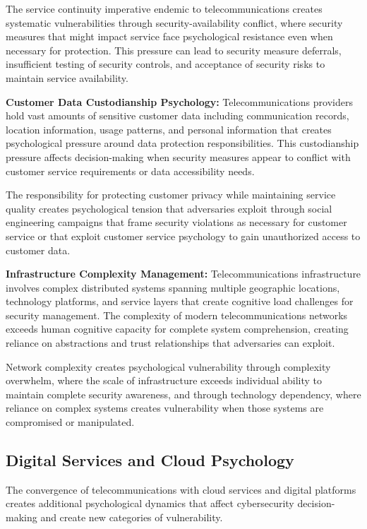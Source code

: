 \documentclass[10pt, twocolumn]{article}
\begin{document}
The service continuity imperative endemic to telecommunications creates systematic vulnerabilities through security-availability conflict, where security measures that might impact service face psychological resistance even when necessary for protection. This pressure can lead to security measure deferrals, insufficient testing of security controls, and acceptance of security risks to maintain service availability.

\textbf{Customer Data Custodianship Psychology:} Telecommunications providers hold vast amounts of sensitive customer data including communication records, location information, usage patterns, and personal information that creates psychological pressure around data protection responsibilities. This custodianship pressure affects decision-making when security measures appear to conflict with customer service requirements or data accessibility needs.

The responsibility for protecting customer privacy while maintaining service quality creates psychological tension that adversaries exploit through social engineering campaigns that frame security violations as necessary for customer service or that exploit customer service psychology to gain unauthorized access to customer data.

\textbf{Infrastructure Complexity Management:} Telecommunications infrastructure involves complex distributed systems spanning multiple geographic locations, technology platforms, and service layers that create cognitive load challenges for security management. The complexity of modern telecommunications networks exceeds human cognitive capacity for complete system comprehension, creating reliance on abstractions and trust relationships that adversaries can exploit.

Network complexity creates psychological vulnerability through complexity overwhelm, where the scale of infrastructure exceeds individual ability to maintain complete security awareness, and through technology dependency, where reliance on complex systems creates vulnerability when those systems are compromised or manipulated.

\subsection{Digital Services and Cloud Psychology}

The convergence of telecommunications with cloud services and digital platforms creates additional psychological dynamics that affect cybersecurity decision-making and create new categories of vulnerability.
\end{document}
